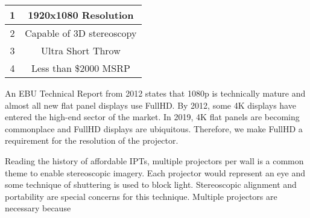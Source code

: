 \begin{center}
	\begin{tabular}{|c|c|}
		\hline 
		1 & 1920x1080 Resolution \\ 
		\hline 
		2 & Capable of 3D stereoscopy \\ 
		\hline 
		3 & Ultra Short Throw \\ 
		\hline 
		4 & Less than \$2000 MSRP \\ 
		\hline 
	\end{tabular} 
\end{center}

An EBU Technical Report from 2012 states that 1080p is technically mature and almost all new flat panel displays use FullHD. By 2012, some 4K displays have entered the high-end sector of the market. \cite{ebuHDTVRef} In 2019, 4K flat panels are becoming commonplace and FullHD displays are ubiquitous. Therefore, we make FullHD a requirement for the resolution of the projector.

Reading the history of affordable IPTs, multiple projectors per wall is a common theme to enable stereoscopic imagery. Each projector would represent an eye and some technique of shuttering is used to block light. Stereoscopic alignment and portability are special concerns for this technique. Multiple projectors are necessary because 


\clearpage
